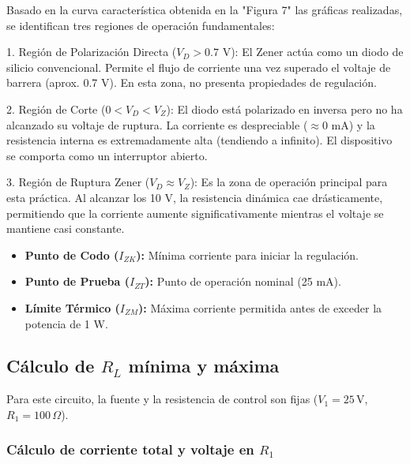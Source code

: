 \documentclass[journal]{IEEEtran}
\begin{document}
Basado en la curva característica obtenida en la "Figura 7" las gráficas realizadas, se identifican tres regiones de operación fundamentales:
\begin{description}
    \item 1. Región de Polarización Directa ($V_D > 0.7$ V):
    El Zener actúa como un diodo de silicio convencional. Permite el flujo de corriente una vez superado el voltaje de barrera (aprox. 0.7 V). En esta zona, no presenta propiedades de regulación.
    
    \item 2. Región de Corte ($0 < V_D < V_Z$):
    El diodo está polarizado en inversa pero no ha alcanzado su voltaje de ruptura. La corriente es despreciable ($\approx 0$ mA) y la resistencia interna es extremadamente alta (tendiendo a infinito). El dispositivo se comporta como un interruptor abierto.
    
    \item 3. Región de Ruptura Zener ($V_D \approx V_Z$):
    Es la zona de operación principal para esta práctica. Al alcanzar los 10 V, la resistencia dinámica cae drásticamente, permitiendo que la corriente aumente significativamente mientras el voltaje se mantiene casi constante.
    
    \begin{itemize}
        \item \textbf{Punto de Codo ($I_{ZK}$):} Mínima corriente para iniciar la regulación.
        \item \textbf{Punto de Prueba ($I_{ZT}$):} Punto de operación nominal (25 mA).
        \item \textbf{Límite Térmico ($I_{ZM}$):} Máxima corriente permitida antes de exceder la potencia de 1 W.
    \end{itemize}
\end{description}



\subsection{Cálculo de $R_L$ mínima y máxima}

Para este circuito, la fuente y la resistencia de control son fijas 
($V_1 = 25\,\text{V}$, $R_1 = 100\,\Omega$).

\subsubsection{Cálculo de corriente total y voltaje en $R_1$}
\end{document}
